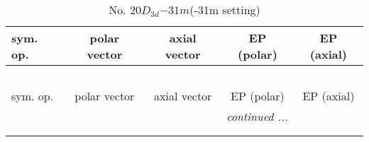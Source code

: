 \documentclass[fleqn,10pt,landscape]{jsarticle}
\begin{document}
\newpage
\begin{center}
\renewcommand{\arraystretch}{1.3}
\begin{longtable}{lcccc}
\caption{No. 20\quad$D_{3d}$\quad$-31m$\quad(-31m setting)\quad[ trigonal ]}
 \\
 \hline \hline
sym. op. & polar vector & axial vector & EP (polar) & EP (axial) \\ \hline \endfirsthead

\multicolumn{4}{l}{\tablename\ \thetable{}} \\
 \hline \hline
sym. op. & polar vector & axial vector & EP (polar) & EP (axial) \\ \hline \endhead

 \hline \hline
\multicolumn{4}{r}{\footnotesize\it continued ...} \\ \endfoot

 \hline \hline
\multicolumn{4}{r}{} \\ \endlastfoot


\end{longtable}
\end{center}
\end{document}
